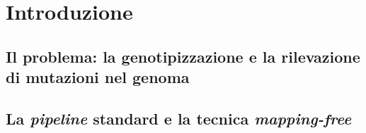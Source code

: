 \documentclass[../main.tex]{subfiles}
\begin{document}
\section{Introduzione}

\subsection{Il problema: la genotipizzazione e la rilevazione di mutazioni nel genoma}

\subsection{La \textit{pipeline} standard e la tecnica \textit{mapping-free}}
\end{document}
